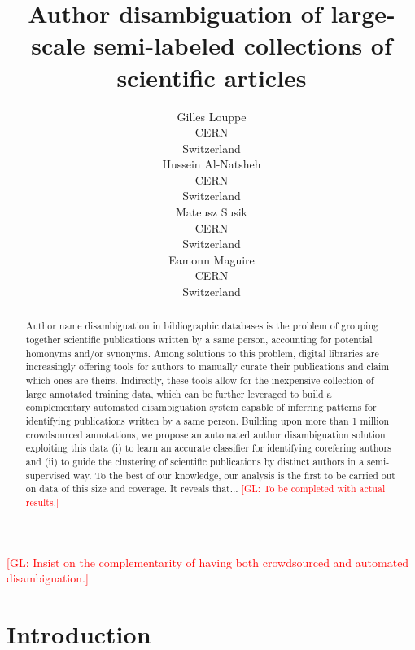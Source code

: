 \documentclass{article}
\title{Author disambiguation of large-scale semi-labeled collections of scientific articles}
\author{Gilles Louppe\\
        CERN\\
        Switzerland\\
\And Hussein Al-Natsheh\\
        CERN\\
        Switzerland\\
\And Mateusz Susik\\
        CERN\\
        Switzerland\\
\And Eamonn Maguire\\
        CERN\\
        Switzerland}
\date{}
\newcommand{\glnote}[1]{\textcolor{red}{[GL: #1]}}
\begin{document}
\maketitle

\begin{abstract}

Author name disambiguation in bibliographic databases is the problem of
grouping together scientific publications written by a same person, accounting
for potential homonyms and/or synonyms. Among solutions to this problem,
digital libraries are increasingly offering tools for authors to manually
curate their publications and claim which ones are theirs. Indirectly, these
tools allow for the inexpensive collection of large annotated training data,
which can be further leveraged to build a complementary automated
disambiguation system capable of inferring patterns for identifying
publications written by a same person.  Building upon more than 1 million
crowdsourced annotations, we propose an automated author disambiguation
solution exploiting this data (i) to learn an accurate classifier for
identifying corefering authors and (ii) to guide the clustering of scientific
publications by distinct authors in a semi-supervised way. To the best of our
knowledge, our analysis is the first to be carried out on data of this size and
coverage. It reveals that... \glnote{To be completed with actual results.}

\end{abstract}

\glnote{Insist on the complementarity of having both crowdsourced and automated disambiguation.}



\section{Introduction}
\label{introduction}

\end{document}
